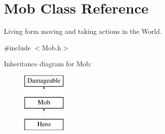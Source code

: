 \hypertarget{class_mob}{}\section{Mob Class Reference}
\label{class_mob}


Living form moving and taking actions in the World.  




{\ttfamily \#include $<$Mob.\+h$>$}

Inheritance diagram for Mob\+:\begin{figure}[H]
\begin{center}
\leavevmode
\includegraphics[height=3.000000cm]{class_mob}
\end{center}
\end{figure}

